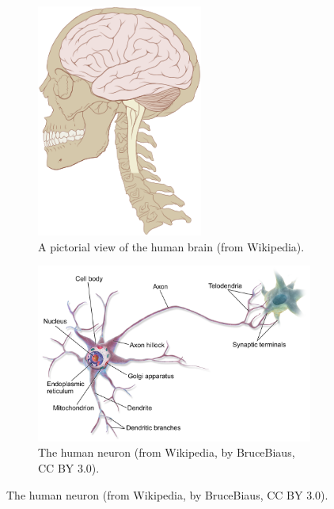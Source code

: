 \begin{figure}[h]
    \centering
    \begin{subfigure}[b]{0.4\textwidth}
    \centering
    \includegraphics[width=0.6\textwidth]{images/humanbrain.png}
    \caption{A pictorial view of the human brain (from Wikipedia).}
    \label{fig:humanbrain}
    \end{subfigure}
    \hfill
        \begin{subfigure}[b]{0.55\textwidth}
        \includegraphics[width=1\textwidth]{images/Blausen_0657_MultipolarNeuron.png}
     \caption{The human neuron (from Wikipedia, by BruceBiaus, CC BY 3.0).}
     \label{fig:neuron}
        \end{subfigure}

\end{figure}
